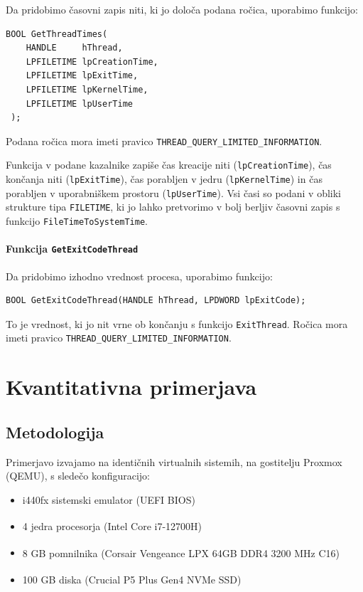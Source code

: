 \documentclass[a4paper,12pt,openright]{book}
\begin{document}
Da pridobimo časovni zapis niti, ki jo določa podana ročica, uporabimo funkcijo:
\begin{lstlisting}[style=func]
 BOOL GetThreadTimes(
	HANDLE     hThread,
	LPFILETIME lpCreationTime,
	LPFILETIME lpExitTime,
	LPFILETIME lpKernelTime,
	LPFILETIME lpUserTime
 );
\end{lstlisting}

Podana ročica mora imeti pravico \texttt{THREAD\_QUERY\_LIMITED\_INFORMATION}.

Funkcija v podane kazalnike zapiše čas kreacije niti (\texttt{lpCreationTime}), čas končanja niti (\texttt{lpExitTime}), čas porabljen v jedru (\texttt{lpKernelTime}) in čas porabljen v uporabniškem prostoru (\texttt{lpUserTime}).
Vsi časi so podani v obliki strukture tipa \texttt{FILETIME}, ki jo lahko pretvorimo v bolj berljiv časovni zapis s funkcijo \texttt{FileTimeToSystemTime}.

\subsubsection{Funkcija \texttt{GetExitCodeThread}}

Da pridobimo izhodno vrednost procesa, uporabimo funkcijo:
\begin{lstlisting}[style=func]
 BOOL GetExitCodeThread(HANDLE hThread, LPDWORD lpExitCode);
\end{lstlisting}

To je vrednost, ki jo nit vrne ob končanju s funkcijo \texttt{ExitThread}.
Ročica mora imeti pravico \texttt{THREAD\_QUERY\_LIMITED\_INFORMATION}.

\chapter{Kvantitativna primerjava}

\section{Metodologija}

Primerjavo izvajamo na identičnih virtualnih sistemih, na gostitelju Proxmox (QEMU), s sledečo konfiguracijo:
\begin{itemize}
	\item i440fx sistemski emulator (UEFI BIOS)
	\item 4 jedra procesorja (Intel\textsuperscript{\textregistered} Core\textsuperscript{\texttrademark} i7-12700H)
	\item 8 GB pomnilnika (Corsair\textsuperscript{\textregistered} Vengeance\textsuperscript{\textregistered} LPX 64GB DDR4 3200 MHz C16)
	\item 100 GB diska (Crucial\textsuperscript{\textregistered} P5 Plus Gen4 NVMe SSD)
\end{itemize}
\end{document}
